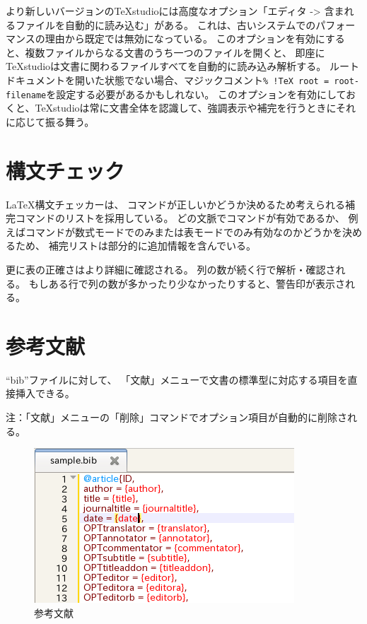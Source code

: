 より新しいバージョンのTeXstudioには高度なオプション「エディタ -\textgreater{} 含まれるファイルを自動的に読み込む」がある。
これは、古いシステムでのパフォーマンスの理由から既定では無効になっている。
このオプションを有効にすると、複数ファイルからなる文書のうち一つのファイルを開くと、
即座にTeXstudioは文書に関わるファイルすべてを自動的に読み込み解析する。 ルートドキュメントを開いた状態でない場合、マジックコメント\verb+% !TeX root = root-filename+を設定する必要があるかもしれない。
このオプションを有効にしておくと、TeXstudioは常に文書全体を認識して、強調表示や補完を行うときにそれに応じて振る舞う。

\section{構文チェック}

LaTeX構文チェッカーは、
コマンドが正しいかどうか決めるため考えられる補完コマンドのリストを採用している。
どの文脈でコマンドが有効であるか、
例えばコマンドが数式モードでのみまたは表モードでのみ有効なのかどうかを決めるため、
補完リストは部分的に追加情報を含んでいる。

更に表の正確さはより詳細に確認される。
列の数が続く行で解析・確認される。
もしある行で列の数が多かったり少なかったりすると、警告印が表示される。

\section{参考文献}

``bib''ファイルに対して、
「文献」メニューで文書の標準型に対応する項目を直接挿入できる。

注：「文献」メニューの「削除」コマンドでオプション項目が自動的に削除される。

\begin{figure}[H]
  \centering
  \includegraphics{doc16.png}
  \caption{参考文献}
\end{figure}


